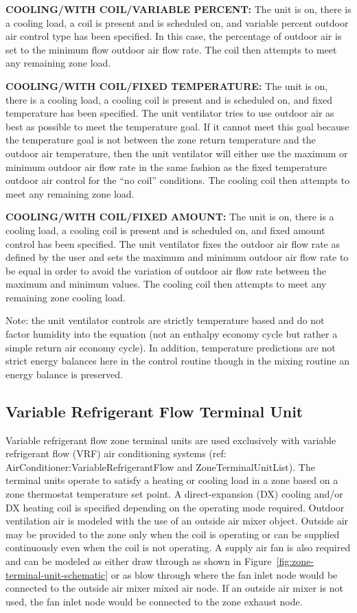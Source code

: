 \textbf{COOLING/WITH COIL/VARIABLE PERCENT:} The unit is on, there is a cooling load, a coil is present and is scheduled on, and variable percent outdoor air control type has been specified. In this case, the percentage of outdoor air is set to the minimum flow outdoor air flow rate. The coil then attempts to meet any remaining zone load.

\textbf{COOLING/WITH COIL/FIXED TEMPERATURE:} The unit is on, there is a cooling load, a cooling coil is present and is scheduled on, and fixed temperature has been specified. The unit ventilator tries to use outdoor air as best as possible to meet the temperature goal. If it cannot meet this goal because the temperature goal is not between the zone return temperature and the outdoor air temperature, then the unit ventilator will either use the maximum or minimum outdoor air flow rate in the same fashion as the fixed temperature outdoor air control for the ``no coil'' conditions. The cooling coil then attempts to meet any remaining zone load.

\textbf{COOLING/WITH COIL/FIXED AMOUNT:} The unit is on, there is a cooling load, a cooling coil is present and is scheduled on, and fixed amount control has been specified. The unit ventilator fixes the outdoor air flow rate as defined by the user and sets the maximum and minimum outdoor air flow rate to be equal in order to avoid the variation of outdoor air flow rate between the maximum and minimum values. The cooling coil then attempts to meet any remaining zone cooling load.

Note: the unit ventilator controls are strictly temperature based and do not factor humidity into the equation (not an enthalpy economy cycle but rather a simple return air economy cycle). In addition, temperature predictions are not strict energy balances here in the control routine though in the mixing routine an energy balance is preserved.

\subsection{Variable Refrigerant Flow Terminal Unit}\label{variable-refrigerant-flow-terminal-unit}

Variable refrigerant flow zone terminal units are used exclusively with variable refrigerant flow (VRF) air conditioning systems (ref: AirConditioner:VariableRefrigerantFlow and ZoneTerminalUnitList). The terminal units operate to satisfy a heating or cooling load in a zone based on a zone thermostat temperature set point. A direct-expansion (DX) cooling and/or DX heating coil is specified depending on the operating mode required. Outdoor ventilation air is modeled with the use of an outside air mixer object. Outside air may be provided to the zone only when the coil is operating or can be supplied continuously even when the coil is not operating. A supply air fan is also required and can be modeled as either draw through as shown in Figure~\ref{fig:zone-terminal-unit-schematic} or as blow through where the fan inlet node would be connected to the outside air mixer mixed air node. If an outside air mixer is not used, the fan inlet node would be connected to the zone exhaust node.

